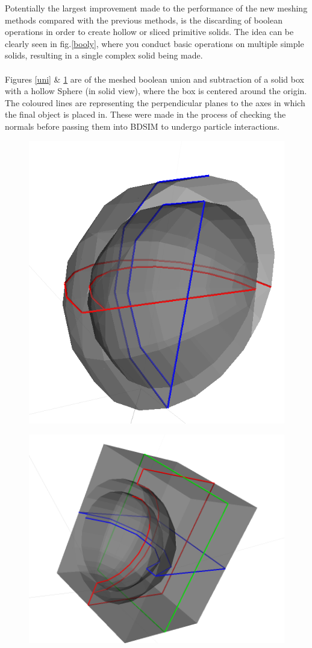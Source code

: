 \documentclass[12pt,a4paper]{article}
\begin{document}
\noindent Potentially the largest improvement made to the performance of the new meshing methods compared with the previous methods, is the discarding of boolean operations in order to create hollow or sliced primitive solids. The idea can be clearly seen in fig.\ref{booly}, where you conduct basic operations on multiple simple solids, resulting in a single complex solid being made.
\\\\
\noindent Figures \ref{uni} \& \ref{sub} are of the meshed boolean union and subtraction of a solid box with a hollow Sphere (in solid view), where the box is centered around the origin. The coloured lines are representing the perpendicular planes to the axes in which the final object is placed in. These were made in the process of checking the normals before passing them into BDSIM to undergo particle interactions.
\\
\begin{figure}[h!]
\centering
\begin{minipage}{.4\textwidth}
  \centering
  \includegraphics[height=0.5\linewidth]{Images//Booleans/SphereUnion.png}
  \label{uni}
\end{minipage}%
\begin{minipage}{.4\textwidth}
  \centering
  \includegraphics[height=0.5\linewidth]{Images//Booleans//SphereSubtraction.png}
  \label{sub}
\end{minipage}%
\end{figure}
\end{document}

